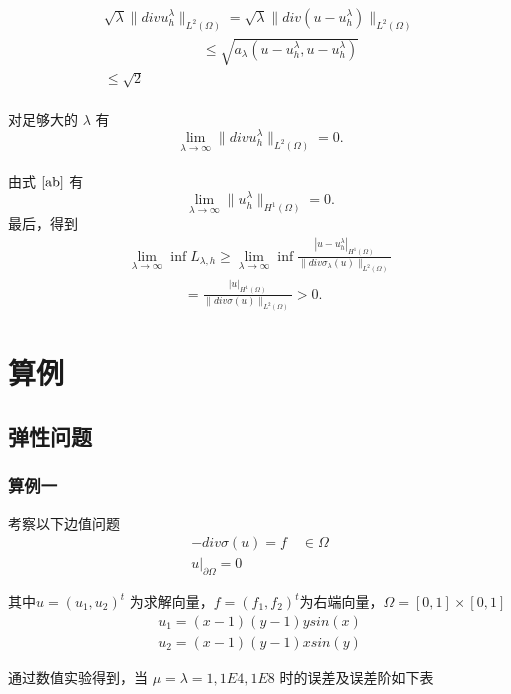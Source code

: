 \documentclass[a4paper,UTF8,titlepage]{ctexart}
\begin{document}
	$$
	\begin{matrix}
		\sqrt{\lambda} \| div u_h^{\lambda} \|_{L^2(\Omega)} = \sqrt{\lambda} \| div(u-u_h^{\lambda}) \|_{L^2(\Omega)} \\ 
		\quad \quad \quad \quad \quad \quad \quad
		\le \sqrt{a_{\lambda}(u-u_h^{\lambda}, u-u_h^{\lambda})} \\
		\le \sqrt{2}	
	\end{matrix}
	$$
	\\
	对足够大的 $\lambda$ 有
	$$
	\lim\limits_{\lambda \to \infty} \| div u_h^{\lambda} \|_{L^2(\Omega)} = 0.
	$$
	\\
	由式 $\eqref{ab}$ 有
	$$
	\lim\limits_{\lambda \to \infty} \| u_h^{\lambda} \|_{H^1(\Omega)} = 0.
	$$
	最后，得到 %
	$$ 
	\begin{matrix}
		\lim\limits_{\lambda \to \infty}\inf L_{\lambda,h} \ge \lim\limits_{\lambda \to \infty}\inf \frac{|u-u_h^{\lambda}|_{H^1(\Omega)}}{\| div \sigma_{\lambda}(u) \|_{L^2(\Omega)}} \\
		\quad \quad \quad \quad
		= \frac{|u|_{H^1(\Omega)}}{\| div \sigma(u) \|_{L^2(\Omega)}} > 0.
	\end{matrix}
	$$
	\fi

\section{算例}

\subsection{弹性问题}

\subsubsection{算例一}

考察以下边值问题
$$
\begin{matrix}
	-div \sigma(u) = f \quad \in \Omega  \\
	u |_{\partial \Omega} = 0
\end{matrix}
$$ 
\par
其中$ u = (u_1,u_2)^t $ 为求解向量，$ f = (f_1,f_2)^t $为右端向量，$ \Omega = [0,1] \times [0,1] $
$$
\begin{matrix}
	u_1 = (x - 1)(y - 1) y sin(x) 
	\\
	u_2 = (x - 1)(y - 1) x sin(y) 
\end{matrix}
$$

通过数值实验得到，当 $\mu = \lambda = 1, 1E4, 1E8$ 时的误差及误差阶如下表
\end{document}
